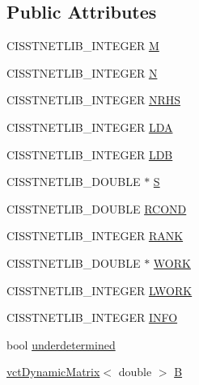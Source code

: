 \subsection*{Public Attributes}
\begin{DoxyCompactItemize}
\item 
C\-I\-S\-S\-T\-N\-E\-T\-L\-I\-B\-\_\-\-I\-N\-T\-E\-G\-E\-R \hyperlink{classnmr_l_s_min_norm_1_1_data_ac00bf9403b20ca5890370d3e788f288e}{M}
\item 
C\-I\-S\-S\-T\-N\-E\-T\-L\-I\-B\-\_\-\-I\-N\-T\-E\-G\-E\-R \hyperlink{classnmr_l_s_min_norm_1_1_data_a840dbb98be27ad44c298d4c90eaadd1c}{N}
\item 
C\-I\-S\-S\-T\-N\-E\-T\-L\-I\-B\-\_\-\-I\-N\-T\-E\-G\-E\-R \hyperlink{classnmr_l_s_min_norm_1_1_data_a506427633858fa8b619866cbdb4ce15c}{N\-R\-H\-S}
\item 
C\-I\-S\-S\-T\-N\-E\-T\-L\-I\-B\-\_\-\-I\-N\-T\-E\-G\-E\-R \hyperlink{classnmr_l_s_min_norm_1_1_data_aa226626d2953d325f1c2738a099d5aad}{L\-D\-A}
\item 
C\-I\-S\-S\-T\-N\-E\-T\-L\-I\-B\-\_\-\-I\-N\-T\-E\-G\-E\-R \hyperlink{classnmr_l_s_min_norm_1_1_data_a9489b20db60c5e3a26941e1810cfe895}{L\-D\-B}
\item 
C\-I\-S\-S\-T\-N\-E\-T\-L\-I\-B\-\_\-\-D\-O\-U\-B\-L\-E $\ast$ \hyperlink{classnmr_l_s_min_norm_1_1_data_afee9998d9b61d300a4e9403e8189aede}{S}
\item 
C\-I\-S\-S\-T\-N\-E\-T\-L\-I\-B\-\_\-\-D\-O\-U\-B\-L\-E \hyperlink{classnmr_l_s_min_norm_1_1_data_a316a55d64f37b94fc0c15d1283cd1426}{R\-C\-O\-N\-D}
\item 
C\-I\-S\-S\-T\-N\-E\-T\-L\-I\-B\-\_\-\-I\-N\-T\-E\-G\-E\-R \hyperlink{classnmr_l_s_min_norm_1_1_data_aac550ee0b64c1eeff7d6768fe59cd946}{R\-A\-N\-K}
\item 
C\-I\-S\-S\-T\-N\-E\-T\-L\-I\-B\-\_\-\-D\-O\-U\-B\-L\-E $\ast$ \hyperlink{classnmr_l_s_min_norm_1_1_data_a1b4ef9acbf885be856123c9d0c8cd67d}{W\-O\-R\-K}
\item 
C\-I\-S\-S\-T\-N\-E\-T\-L\-I\-B\-\_\-\-I\-N\-T\-E\-G\-E\-R \hyperlink{classnmr_l_s_min_norm_1_1_data_a50a5cd5f8089b150431899161b97aa2b}{L\-W\-O\-R\-K}
\item 
C\-I\-S\-S\-T\-N\-E\-T\-L\-I\-B\-\_\-\-I\-N\-T\-E\-G\-E\-R \hyperlink{classnmr_l_s_min_norm_1_1_data_a0f96a3e574e23758c6d7e362abad201e}{I\-N\-F\-O}
\item 
bool \hyperlink{classnmr_l_s_min_norm_1_1_data_aa0ce32b53580c83249841c05d59400a9}{underdetermined}
\item 
\hyperlink{classvct_dynamic_matrix}{vct\-Dynamic\-Matrix}$<$ double $>$ \hyperlink{classnmr_l_s_min_norm_1_1_data_a315f698926b4797c974dc79b7138802a}{B}
\end{DoxyCompactItemize}


